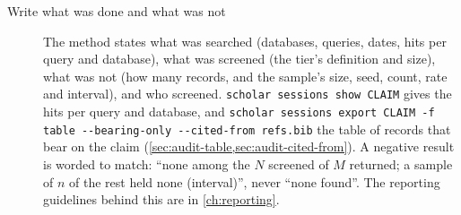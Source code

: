 \begin{description}
\item[Write what was done and what was not]
  The method states what was searched (databases, queries, dates, hits
  per query and database), what was screened (the tier's definition and
  size), what was not (how many records, and the sample's size, seed,
  count, rate and interval), and who screened.
  \texttt{scholar sessions show CLAIM} gives the hits per query and
  database, and \texttt{scholar sessions export CLAIM -f table
  -{}-bearing-only -{}-cited-from refs.bib} the table of records that bear on
  the claim (\cref{sec:audit-table,sec:audit-cited-from}).
  A negative result is worded to match: \enquote{none among the $N$
  screened of $M$ returned; a sample of $n$ of the rest held none
  (interval)}, never \enquote{none found}.
  The reporting guidelines behind this are in \cref{ch:reporting}.
\end{description}
\endgroup

